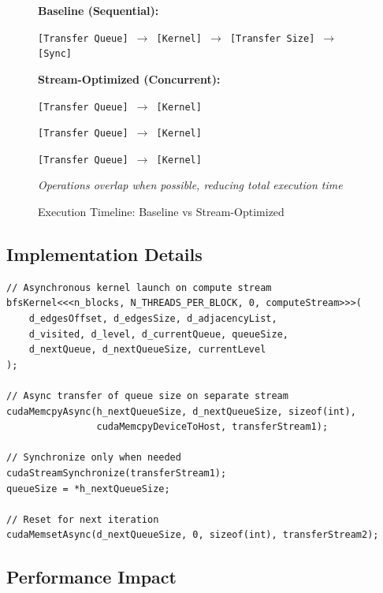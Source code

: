 \documentclass[11pt,a4paper]{article}
\begin{document}
\begin{figure}[H]
\centering
\begin{tcolorbox}[colback=green!5!white,colframe=green!75!black,width=0.9\textwidth]
\textbf{Baseline (Sequential):}

\texttt{[Transfer Queue] $\rightarrow$ [Kernel] $\rightarrow$ [Transfer Size] $\rightarrow$ [Sync]}

\vspace{0.5cm}

\textbf{Stream-Optimized (Concurrent):}

\texttt{[Transfer Queue] $\rightarrow$ [Kernel]}

\hspace{3cm}\texttt{[Transfer Queue] $\rightarrow$ [Kernel]}

\hspace{5.5cm}\texttt{[Transfer Queue] $\rightarrow$ [Kernel]}

\vspace{0.3cm}
\textit{Operations overlap when possible, reducing total execution time}
\end{tcolorbox}
\caption{Execution Timeline: Baseline vs Stream-Optimized}
\end{figure}

\subsection{Implementation Details}

\begin{lstlisting}[caption={Asynchronous BFS with Streams}]
// Asynchronous kernel launch on compute stream
bfsKernel<<<n_blocks, N_THREADS_PER_BLOCK, 0, computeStream>>>(
    d_edgesOffset, d_edgesSize, d_adjacencyList,
    d_visited, d_level, d_currentQueue, queueSize,
    d_nextQueue, d_nextQueueSize, currentLevel
);

// Async transfer of queue size on separate stream
cudaMemcpyAsync(h_nextQueueSize, d_nextQueueSize, sizeof(int),
                cudaMemcpyDeviceToHost, transferStream1);

// Synchronize only when needed
cudaStreamSynchronize(transferStream1);
queueSize = *h_nextQueueSize;

// Reset for next iteration
cudaMemsetAsync(d_nextQueueSize, 0, sizeof(int), transferStream2);
\end{lstlisting}

\subsection{Performance Impact}
\end{document}
